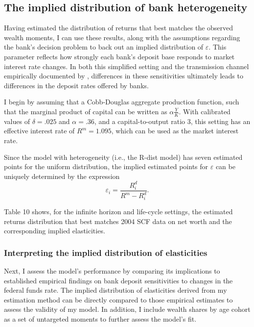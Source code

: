  \subsection{The implied distribution of bank heterogeneity}

  \par Having estimated the distribution of returns that best matches the observed wealth moments, I can use these results, along with the assumptions regarding the bank's decision problem to back out an implied distribution of $\varepsilon$. This parameter reflects how strongly each bank’s deposit base responds to market interest rate changes. In both this simplified setting and the transmission channel empirically documented by \cite{Drechsler2017}, differences in these sensitivities ultimately leads to differences in the deposit rates offered by banks.  

  \par I begin by assuming that a Cobb-Douglas aggregate production function, such that the marginal product of capital can be written as $\alpha \frac{Y}{K}$. With calibrated values of $\delta = .025$ and $\alpha = .36$, and a capital-to-output ratio $3$, this setting has an effective interest rate of $R^m = 1.095$, which can be used as the market interest rate.

  \par Since the model with heterogeneity (i.e., the R-dist model) has seven estimated points for the uniform distribution, the implied estimated points for $\varepsilon$ can be uniquely determined by the expression $$\varepsilon_i = \frac{R_i^d}{R^m - R_i^d} .$$

  \par Table 10 shows, for the infinite horizon and life-cycle settings, the estimated returns distribution that best matches 2004 SCF data on net worth and the corresponding implied elasticities. 

   

  \subsubsection{Interpreting the implied distribution of elasticities}

    \par Next, I assess the model's performance by comparing its implications to established empirical findings on bank deposit sensitivities to changes in the federal funds rate. The implied distribution of elasticities derived from my estimation method can be directly compared to those empirical estimates to assess the validity of my model. In addition, I include wealth shares by age cohort as a set of untargeted moments to further assess the model's fit.  

